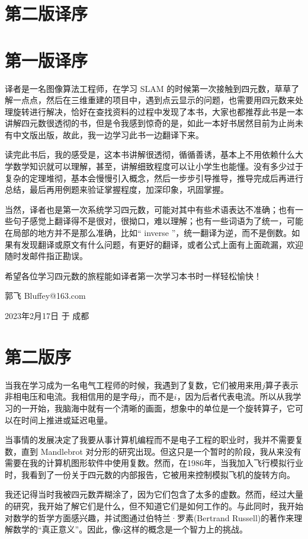 \section*{第二版译序} 

\section*{第一版译序} 
译者是一名图像算法工程师，在学习 SLAM 的时候第一次接触到四元数，草草了解一点点，然后在三维重建的项目中，遇到点云显示的问题，也需要用四元数来处理旋转进行解决，恰好在查找资料的过程中发现了本书，大家也都推荐此书是一本讲解四元数很透彻的书，但是令我感到惊奇的是，如此一本好书居然目前为止尚未有中文版出版，故此，我一边学习此书一边翻译下来。

读完此书后，我的感受是，这本书讲解很透彻，循循善诱，基本上不用依赖什么大学数学知识就可以理解，甚至，讲解细致程度可以让小学生也能懂。没有多少过于复杂的定理堆彻，基本会慢慢引入概念，然后一步步引导推导，推导完成后再进行总结，最后再用例题来验证掌握程度，加深印象，巩固掌握。

当然，译者也是第一次系统学习四元数，可能对其中有些术语表达不准确；也有一些句子感觉上翻译得不是很对，很拗口，难以理解；也有一些词语为了统一，可能在局部的地方并不是那么准确，比如“ inverse ”，统一翻译为逆，而不是倒数。如果有发现翻译或原文有什么问题，有更好的翻译，或者公式上面有上面疏漏，欢迎随时发邮件指正勘误。

希望各位学习四元数的旅程能如译者第一次学习本书时一样轻松愉快！

\hfill 郭飞  Bluffey@163.com

\hfill 2023年2月17日 于 成都 

\newpage
{}
\section*{第二版序}
当我在学习成为一名电气工程师的时候，我遇到了复数，它们被用来用$j$算子表示非相电压和电流。我相信用的是字母$j$，而不是$i$，因为后者代表电流。所以从我学习的一开始，我脑海中就有一个清晰的画面，想象中的单位是一个旋转算子，它可以在时间上推进或延迟电量。

当事情的发展决定了我要从事计算机编程而不是电子工程的职业时，我并不需要复数，直到 Mandlebrot 对分形的研究出现。但这只是一个暂时的阶段，我从来没有需要在我的计算机图形软件中使用复数。然而，在1986年，当我加入飞行模拟行业时，我看到了一份关于四元数的内部报告，它被用来控制模拟飞机的旋转方向。

我还记得当时我被四元数弄糊涂了，因为它们包含了太多的虚数。然而，经过大量的研究，我开始了解它们是什么，但不知道它们是如何工作的。与此同时，我开始对数学的哲学方面感兴趣，并试图通过伯特兰·罗素(Bertrand Russell)的著作来理解数学的“真正意义”。因此，像$i$这样的概念是一个智力上的挑战。

